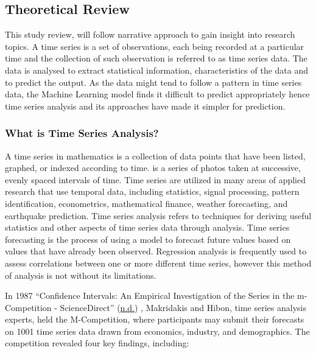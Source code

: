 \documentclass[
  onepage,
  openany]{scrbook}
\begin{document}
\hypertarget{theoretical-review}{%
\subsection{Theoretical Review}\label{theoretical-review}}

This study review, will follow narrative approach to gain insight into
research topics. A time series is a set of observations, each being
recorded at a particular time and the collection of such observation is
referred to as time series data. The data is analysed to extract
statistical information, characteristics of the data and to predict the
output. As the data might tend to follow a pattern in time series data,
the Machine Learning model finds it difficult to predict appropriately
hence time series analysis and its approaches have made it simpler for
prediction.

\hypertarget{what-is-time-series-analysis}{%
\subsubsection{What is Time Series
Analysis?}\label{what-is-time-series-analysis}}

A time series in mathematics is a collection of data points that have
been listed, graphed, or indexed according to time. is a series of
photos taken at successive, evenly spaced intervals of time. Time series
are utilized in many areas of applied research that use temporal data,
including statistics, signal processing, pattern identification,
econometrics, mathematical finance, weather forecasting, and earthquake
prediction. Time series analysis refers to techniques for deriving
useful statistics and other aspects of time series data through
analysis. Time series forecasting is the process of using a model to
forecast future values based on values that have already been observed.
Regression analysis is frequently used to assess correlations between
one or more different time series, however this method of analysis is
not without its limitations.

In 1987 {``Confidence Intervals: An Empirical Investigation of the
Series in the m-Competition - ScienceDirect''}
(\protect\hyperlink{ref-confiden}{n.d.}) , Makridakis and Hibon, time
series analysis experts, held the M-Competition, where participants may
submit their forecasts on 1001 time series data drawn from economics,
industry, and demographics. The competition revealed four key findings,
including:
\end{document}
